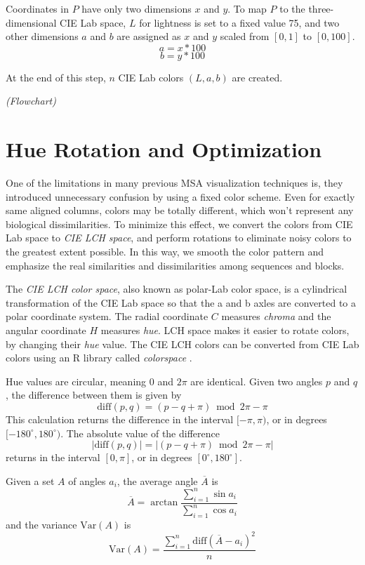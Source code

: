 Coordinates in $P$ have only two dimensions $x$ and $y$. To map $P$ to the three-dimensional CIE Lab space, $L$ for lightness is set to a fixed value 75, and two other dimensions $a$ and $b$ are assigned as $x$ and $y$ scaled from $[0,1]$ to $[0, 100]$. $$a=x*100$$ $$b=y*100$$

At the end of this step, $n$ CIE Lab colors $(L, a, b)$ are created.

\emph{(Flowchart)}

\section{Hue Rotation and Optimization}\label{sec:rotation}

One of the limitations in many previous MSA visualization techniques is, they introduced unnecessary confusion by using a fixed color scheme. Even for exactly same aligned columns, colors may be totally different, which won't represent any biological dissimilarities. To minimize this effect, we convert the colors from CIE Lab space to \emph{CIE LCH space}, and perform rotations to eliminate noisy colors to the greatest extent possible. In this way, we smooth the color pattern and emphasize the real similarities and dissimilarities among sequences and blocks.

The \emph{CIE LCH color space}, also known as polar-Lab color space, is a cylindrical transformation of the CIE Lab space so that the a and b axles are converted to a polar coordinate system. The radial coordinate $C$ measures \emph{chroma} and the angular coordinate $H$ measures \emph{hue}. LCH space makes it easier to rotate colors, by changing their \emph{hue} value. The CIE LCH colors can be converted from CIE Lab colors using an R library called \emph{colorspace} \cite{Ihaka:2009aa,Zeileis:2009aa}.

Hue values are circular, meaning $0$ and $2\pi$ are identical. Given two angles $p$ and $q$, the difference between them is given by $$\mathrm{diff}(p,q) = (p - q + \pi) \bmod 2\pi - \pi$$ This calculation returns the difference in the interval $[-\pi, \pi)$, or in degrees $[-180^{\circ}, 180^{\circ})$. The absolute value of the difference $$|\mathrm{diff}(p,q)| = |(p - q + \pi) \bmod 2\pi - \pi|$$ returns in the interval $[0, \pi]$, or in degrees $[0^{\circ}, 180^{\circ}]$.

Given a set $A$ of angles $a_i$, the average angle $\overline{A}$ is $$\overline{A}=\arctan{\frac{\displaystyle\sum_{i=1}^n \sin{a_i}}{\displaystyle\sum_{i=1}^n \cos{a_i}}}$$ and the variance $\mathrm{Var}(A)$ is $$\mathrm{Var}(A)=\frac{\displaystyle\sum_{i=1}^n \mathrm{diff}(\overline{A}-a_i)^2}{n}$$

